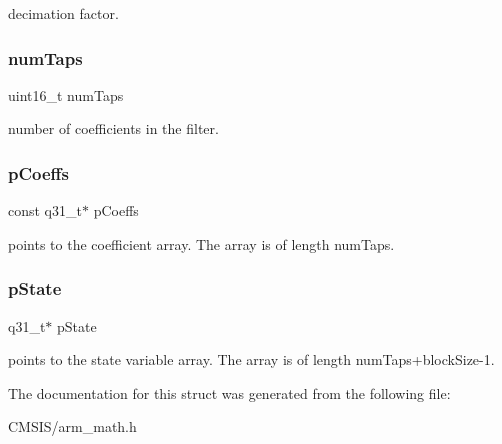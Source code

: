 decimation factor. \mbox{\label{structarm__fir__decimate__instance__q31_a751941891e47f522a7f5375fe8990aac}} 
\subsubsection{\texorpdfstring{numTaps}{numTaps}}
{\footnotesize\ttfamily uint16\+\_\+t num\+Taps}

number of coefficients in the filter. \mbox{\label{structarm__fir__decimate__instance__q31_a80e7fdf4747dbda8eadb2663fb4be317}} 
\subsubsection{\texorpdfstring{pCoeffs}{pCoeffs}}
{\footnotesize\ttfamily const q31\+\_\+t$\ast$ p\+Coeffs}

points to the coefficient array. The array is of length num\+Taps. \mbox{\label{structarm__fir__decimate__instance__q31_adee4ba3ee8869865af7d8fa08ca913d6}} 
\subsubsection{\texorpdfstring{pState}{pState}}
{\footnotesize\ttfamily q31\+\_\+t$\ast$ p\+State}

points to the state variable array. The array is of length num\+Taps+block\+Size-\/1. 

The documentation for this struct was generated from the following file\+:\begin{DoxyCompactItemize}
\item 
C\+M\+S\+I\+S/arm\+\_\+math.\+h\end{DoxyCompactItemize}
